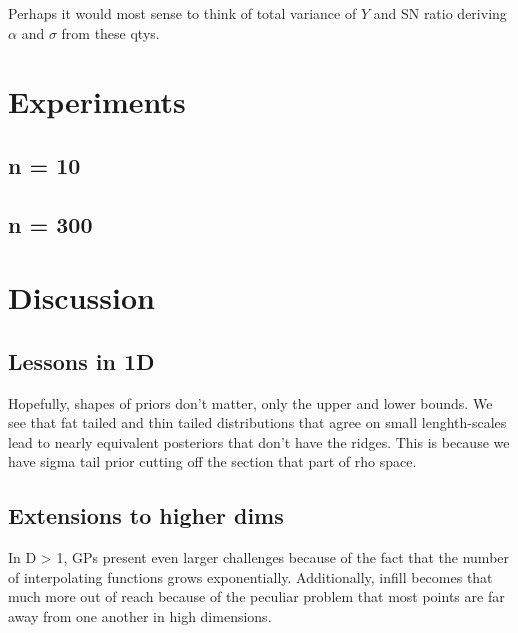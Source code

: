 \documentclass{article}
\begin{document}
Perhaps it would most sense to think of total variance of $Y$ and SN ratio
deriving $\alpha$ and $\sigma$ from these qtys.

\section{Experiments}

\subsection{n = 10}

\subsection{n = 300}

\section{Discussion}

\subsection{Lessons in 1D}

Hopefully, shapes of priors don't matter, only the upper and lower bounds. We
see that fat tailed and thin tailed distributions that agree on small
lenghth-scales lead to nearly equivalent posteriors that don't have the ridges.
This is because we have sigma tail prior cutting off the section that part of
rho space.

\subsection{Extensions to higher dims}

In D > 1, GPs present even larger challenges because of the fact that the
number of interpolating functions grows exponentially. Additionally, 
infill becomes that much more out of reach because of the peculiar
problem that most points are far away from one another in high dimensions.




\end{document}
